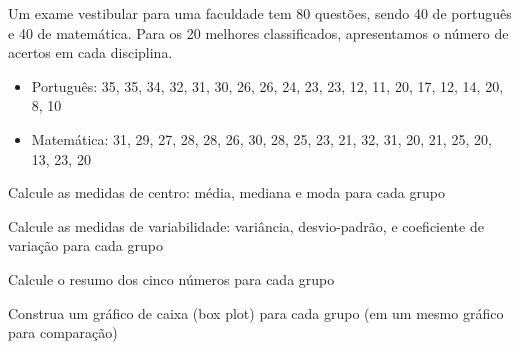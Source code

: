 \documentclass[a4paper,11pt,fleqn]{article}\usepackage[]{graphicx}\usepackage[]{color}
\theoremstyle{definition}
\begin{document}

\begin{compactenum}[4.] %
\item Um exame vestibular para uma faculdade tem 80 questões, sendo 40
  de português e 40 de matemática. Para os 20 melhores classificados,
  apresentamos o número de acertos em cada disciplina.
  \begin{itemize}
  \item Português: 35, 35, 34, 32, 31, 30, 26, 26, 24, 23, 23, 12, 11,
    20, 17, 12, 14, 20, 8, 10
  \item Matemática: 31, 29, 27, 28, 28, 26, 30, 28, 25, 23, 21, 32, 31,
    20, 21, 25, 20, 13, 23, 20
  \end{itemize}

\begin{compactenum}
\item Calcule as medidas de centro: média, mediana e moda para cada grupo

  \item Calcule as medidas de variabilidade: variância, desvio-padrão, e
    coeficiente de variação para cada grupo

  \item Calcule o resumo dos cinco números para cada grupo

  \item Construa um gráfico de caixa (box plot) para cada grupo (em um mesmo
    gráfico para comparação)



\end{compactenum}
\end{compactenum}
\end{document}
